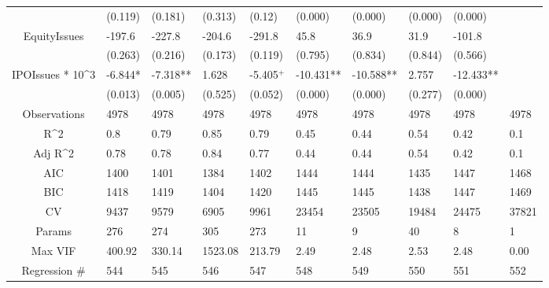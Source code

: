 \documentclass{article}
\begin{document}
\begin{table}[H]
\begin{tabular}{|clllllllll|}
   & (0.119) & (0.181) & (0.313) & (0.12) & (0.000) & (0.000) & (0.000) & (0.000) &  \\ 
  EquityIssues & -197.6 & -227.8 & -204.6 & -291.8 & 45.8 & 36.9 & 31.9 & -101.8 &  \\ 
   & (0.263) & (0.216) & (0.173) & (0.119) & (0.795) & (0.834) & (0.844) & (0.566) &  \\ 
  IPOIssues * 10^3 & -6.844* & -7.318** & 1.628 & -5.405$^{+}$ & -10.431** & -10.588** & 2.757 & -12.433** &  \\ 
   & (0.013) & (0.005) & (0.525) & (0.052) & (0.000) & (0.000) & (0.277) & (0.000) &  \\ 
  \hline 
 Observations & 4978 & 4978 & 4978 & 4978 & 4978 & 4978 & 4978 & 4978 & 4978 \\ 
  R^2 & 0.8 & 0.79 & 0.85 & 0.79 & 0.45 & 0.44 & 0.54 & 0.42 & 0.1 \\ 
  Adj R^2 & 0.78 & 0.78 & 0.84 & 0.77 & 0.44 & 0.44 & 0.54 & 0.42 & 0.1 \\ 
  AIC & 1400 & 1401 & 1384 & 1402 & 1444 & 1444 & 1435 & 1447 & 1468 \\ 
  BIC & 1418 & 1419 & 1404 & 1420 & 1445 & 1445 & 1438 & 1447 & 1469 \\ 
  CV & 9437 & 9579 & 6905 & 9961 & 23454 & 23505 & 19484 & 24475 & 37821 \\ 
  Params & 276 & 274 & 305 & 273 & 11 & 9 & 40 & 8 & 1 \\ 
  Max VIF & 400.92 & 330.14 & 1523.08 & 213.79 & 2.49 & 2.48 & 2.53 & 2.48 & 0.00 \\ 
  Regression \# & 544 & 545 & 546 & 547 & 548 & 549 & 550 & 551 & 552 \\ 
   \hline
\end{tabular}
 
\end{table}
\end{document}
